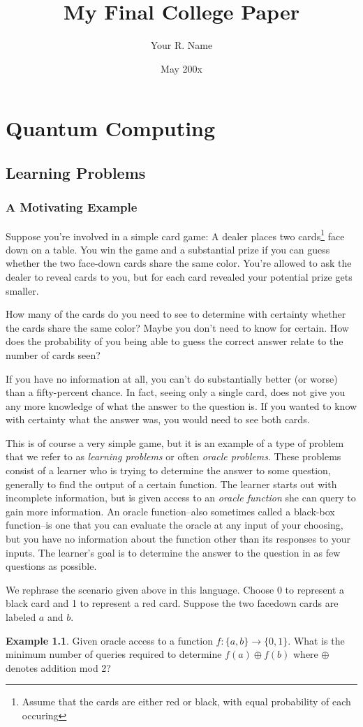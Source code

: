 \documentclass[12pt,twoside]{reedthesis}
\title{My Final College Paper}
\author{Your R. Name}
\date{May 200x}
\theoremstyle{definition}\newtheorem{definition}{Definition}
\theoremstyle{definition}\newtheorem{example}{Example}
\begin{document}
\onehalfspacing
\chapter{Quantum Computing}

\section{Learning Problems}

\subsection{A Motivating Example}
Suppose you're involved in a simple card game: A dealer places two cards\footnote{Assume that the cards are either red or black, with equal probability of each occuring}  face down on a table. You win the game and a substantial prize if you can guess whether the two face-down cards share the same color. You're allowed to ask the dealer to reveal cards to you, but for each card revealed your potential prize gets smaller.

How many of the cards do you need to see to determine with certainty whether the cards share the same color? Maybe you don't need to know for certain. How does the probability of you being able to guess the correct answer relate to the number of cards seen?


If you have no information at all, you can't do substantially better (or worse) than a fifty-percent chance. In fact, seeing only a single card, does not give you any more knowledge of what the answer to the question is. If you wanted to know with certainty what the answer was, you would need to see both cards.


This is of course a very simple game, but it is an example of a type of problem that we refer to as \emph{learning problems} or often \emph{oracle problems}. These problems consist of a learner who is trying to determine the answer to some question, generally to find the output of a certain function. The learner starts out with incomplete information, but is given access to an \emph{oracle function} she can query to gain more information. An oracle function--also sometimes called a black-box function--is one that you can evaluate the oracle at any input of your choosing, but you have no information about the function other than its responses to your inputs. The learner's goal is to determine the answer to the question in as few questions as possible.

We rephrase the scenario given above in this language.
Choose 0 to represent a black card and 1 to represent a red card. Suppose the two facedown cards are labeled $a$ and $b$.
\begin{example}
Given oracle access to a function $f: \{a, b\} \rightarrow \{0, 1\}$. What is the minimum number of queries required to determine $f(a) \oplus f(b)$ where $\oplus$ denotes addition mod 2?
\end{example}
\end{document}
